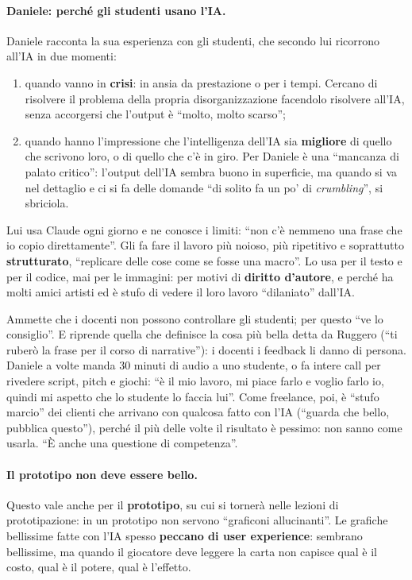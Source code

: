 \paragraph{Daniele: perché gli studenti usano l'IA.} Daniele racconta la sua
esperienza con gli studenti, che secondo lui ricorrono all'IA in due momenti:
\begin{enumerate}
  \item quando vanno in \textbf{crisi}: in ansia da prestazione o per i tempi.
        Cercano di risolvere il problema della propria disorganizzazione
        facendolo risolvere all'IA, senza accorgersi che l'output è ``molto,
        molto scarso'';
  \item quando hanno l'impressione che l'intelligenza dell'IA sia
        \textbf{migliore} di quello che scrivono loro, o di quello che c'è in
        giro. Per Daniele è una ``mancanza di palato critico'': l'output dell'IA
        sembra buono in superficie, ma quando si va nel dettaglio e ci si fa
        delle domande ``di solito fa un po' di \emph{crumbling}'', si sbriciola.
\end{enumerate}
Lui usa Claude ogni giorno e ne conosce i limiti: ``non c'è nemmeno una frase
che io copio direttamente''. Gli fa fare il lavoro più noioso, più ripetitivo e
soprattutto \textbf{strutturato}, ``replicare delle cose come se fosse una
macro''. Lo usa per il testo e per il codice, mai per le immagini: per motivi di
\textbf{diritto d'autore}, e perché ha molti amici artisti ed è stufo di vedere
il loro lavoro ``dilaniato'' dall'IA.

Ammette che i docenti non possono controllare gli studenti; per questo
``ve lo consiglio''. E riprende quella che definisce la cosa più bella detta da
Ruggero (``ti ruberò la frase per il corso di narrative''): i docenti i feedback
li danno di persona. Daniele a volte manda 30 minuti di audio a uno studente, o
fa intere call per rivedere script, pitch e giochi: ``è il mio lavoro, mi piace
farlo e voglio farlo io, quindi mi aspetto che lo studente lo faccia lui''. Come
freelance, poi, è ``stufo marcio'' dei clienti che arrivano con qualcosa fatto
con l'IA (``guarda che bello, pubblica questo''), perché il più delle volte il
risultato è pessimo: non sanno come usarla. ``È anche una questione di
competenza''.

\paragraph{Il prototipo non deve essere bello.} Questo vale anche per il
\textbf{prototipo}, su cui si tornerà nelle lezioni di prototipazione: in un
prototipo non servono ``graficoni allucinanti''. Le grafiche bellissime fatte con
l'IA spesso \textbf{peccano di user experience}: sembrano bellissime, ma quando
il giocatore deve leggere la carta non capisce qual è il costo, qual è il
potere, qual è l'effetto.

